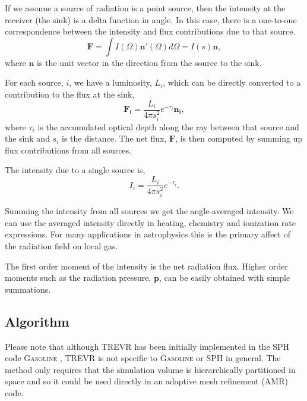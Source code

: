 \documentclass[fleq,usenatbib]{mnras}
\newcommand{\acro}{TREVR}
\begin{document}
If we assume a source of radiation is a point source, then the intensity at 
the receiver (the sink) is a delta function in angle. In this case, there is a 
one-to-one correspondence between the intensity and flux contributions due to 
that source.
\begin{equation}
  \mathbf{F} = \int I(\Omega) \mathbf{n'}(\Omega) d\Omega = I(s) \mathbf{n},
\end{equation}
where $\mathbf{n}$ is the unit vector in the direction from the source to the 
sink.

For each source, $i$, we have a luminosity, $L_i$, which can be directly 
converted to a contribution to the flux at the sink,
\begin{equation}
\label{eqn:simpflux}
\mathbf{F_i} = \frac{L_i}{4\pi s_i^2} e^{-\tau_i} \mathbf{n_i},
\end{equation}
where $\tau_i$ is the accumulated optical depth along the ray between that 
source and the sink and $s_i$ is the distance. The net flux, $\mathbf{F}$, is 
then computed by summing up flux contributions from all sources.

The intensity due to a single source is,
\begin{equation}
\label{eqn:simpint}
I_i = \frac{L_i}{4\pi s_i^2} e^{-\tau_i}.
\end{equation}

Summing the intensity from all sources we get the angle-averaged intensity. We 
can use the averaged intensity directly in heating, chemistry and ionization 
rate expressions. For many applications in astrophysics this is the primary 
affect of the radiation field on local gas.

The first order moment of the intensity is the net radiation flux.  Higher 
order moments such as the radiation pressure, $\mathbf{p}$, can be easily 
obtained with simple summations.


\subsection{Algorithm}\label{sec:algo}
Please note that although \acro{} has been initially implemented in the 
SPH code \textsc{Gasoline} \citep{wadsleyEt03}, \acro{} is not specific to 
\textsc{Gasoline} or SPH in general. The method only requires that the 
simulation volume is hierarchically partitioned in space and so it could be 
used directly in an adaptive mesh refinement (AMR) code.
 
\end{document}
